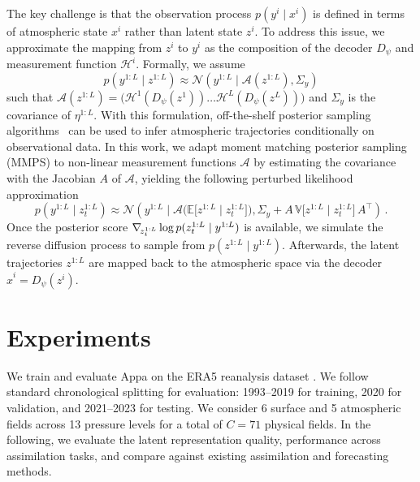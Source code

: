 The key challenge is that the observation process $p(y^i \mid x^i)$ is defined in terms of atmospheric state $x^i$ rather than latent state $z^i$. To address this issue, we approximate the mapping from $z^i$ to $y^i$ as the composition of the decoder $D_\psi$ and measurement function $\mathcal{H}^i$. Formally, we assume
\begin{equation}
    p(y^{1:L} \mid z^{1:L}) \approx \mathcal{N} \left( y^{1:L} \mid \mathcal{A}(z^{1:L}), \Sigma_{y} \right)
\end{equation}
such that $\mathcal{A}(z^{1:L}) = \big( \mathcal{H}^{1}(D_\psi(z^{1})) \dots \mathcal{H}^{L}(D_\psi(z^{L})) \big)$ and $\Sigma_y$ is the covariance of $\eta^{1:L}$. With this formulation, off-the-shelf posterior sampling algorithms~\cite{daras2024survey} can be used to infer atmospheric trajectories conditionally on observational data. In this work, we adapt moment matching posterior sampling (MMPS) \cite{rozet2024learning} to non-linear measurement functions $\mathcal{A}$ by estimating the covariance with the Jacobian $A$ of $\mathcal{A}$, yielding the following perturbed likelihood approximation
\begin{equation}
    p(y^{1:L} \mid z^{1:L}_t) \approx \mathcal{N} \left(y^{1:L} \mid \mathcal{A} \big( \mathbb{E} \big[z^{1:L} \mid z^{1:L}_t\big] \big), \Sigma_y + A \, \mathbb{V} \big[z^{1:L} \mid z^{1:L}_t\big] \, A^\top \right) \, .
\end{equation}
Once the posterior score $\nabla_{\!{z^{1:L}_t}} \log p(z^{1:L}_t \mid y^{1:L})$ is available, we simulate the reverse diffusion process \cite{song2021scorebased} to sample from $p(z^{1:L} \mid y^{1:L})$. Afterwards, the latent trajectories $z^{1:L}$ are mapped back to the atmospheric space via the decoder $\hat{x}^i = D_\psi(z^i)$.

\section{Experiments} \label{sec:appa-experiments}

We train and evaluate Appa on the ERA5 reanalysis dataset \cite{hersbach2020era5}. We follow standard chronological splitting for evaluation: 1993--2019 for training, 2020 for validation, and 2021--2023 for testing. We consider 6 surface and 5 atmospheric fields across 13 pressure levels for a total of $C=71$ physical fields. In the following, we evaluate the latent representation quality, performance across assimilation tasks, and compare against existing assimilation and forecasting methods.

